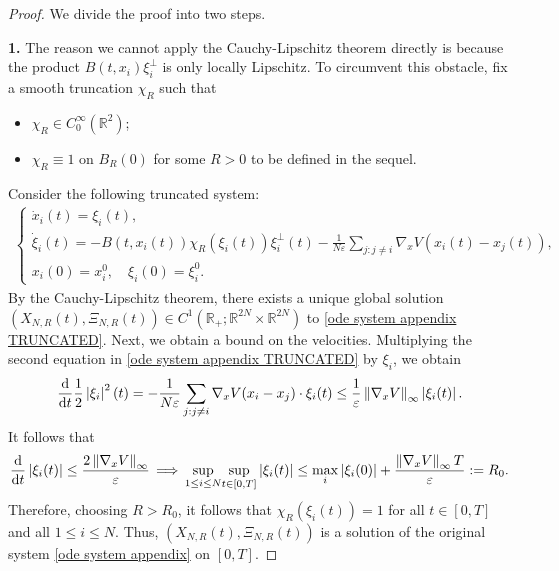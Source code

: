 \documentclass[11pt,reqno]{amsart}
\numberwithin{equation}{section}
\def\dd{{\rm d}}
\begin{document}
\begin{proof} We divide the proof into two steps.

\smallskip
\textbf{1.} The reason we cannot apply the Cauchy-Lipschitz theorem  directly is because the product $B(t,x_{i})\xi_{i}^{\perp}$ is only locally Lipschitz. To circumvent this obstacle, fix a smooth truncation $\chi_{R}$ such that  
\begin{itemize}
 \item[{\rm(a)}] $\chi_{R}\in C^{\infty}_{0}(\mathbb{R}^{2})$; 
\item[{\rm(b)}] $\chi_{R}\equiv 1$ on $B_{R}(0)$ for some $R>0$ to be defined in the sequel. 
\end{itemize}
Consider the following truncated system: 
\begin{align}\tag{N$R$}
\begin{cases}
\dot x_{i}(t)=\xi_{i}(t),\\
\dot \xi_{i}(t)=-B(t,x_{i}(t))\chi_{R}(\xi_{i}(t))\xi_{i}^{\perp}(t)-\frac{1}{N\varepsilon}\underset{j:j\neq i}{\sum}\nabla_{x} V(x_{i}(t)-x_{j}(t)), \\
x_{i}(0)=x_{i}^{0},\quad \xi_{i}(0)=\xi_{i}^{0}. 
\end{cases}
\label{ode system appendix TRUNCATED}
\end{align}
By the Cauchy-Lipschitz theorem, there exists 
a unique global solution $(X_{N,R}(t),\Xi_{N,R}(t))\in C^{1}(\mathbb{R}_{+};\mathbb{R}^{2N}\times \mathbb{R}^{2N})$ to \eqref{ode system appendix TRUNCATED}.  
Next, we obtain a bound on the velocities. 
Multiplying the second equation in \eqref{ode system appendix TRUNCATED} by $\xi_{i}$, we obtain 
\begin{align*}
\frac{\dd}{\dd t}\frac{1}{2}\left\vert \xi_{i}\right\vert^{2}(t)=- \frac{1}{N\varepsilon} \sum_{j:j\neq i}\nabla_{x}V(x_{i}-x_{j})\cdot \xi_{i}(t)\leq \frac{1}{\varepsilon}\left\Vert \nabla_{x}V\right\Vert_{\infty}\left\vert \xi_{i}(t)\right\vert.     
\end{align*}
It follows that 
\begin{align*}
\frac{\dd}{\dd t}\left\vert \xi_{i}(t)\right\vert\leq \frac{2\left\Vert \nabla_{x}V\right\Vert_{\infty}}{\varepsilon}\,\Longrightarrow\, 
\underset{1\leq i\leq N}{\sup}\underset{t\in [0,T]}{\sup}\left\vert \xi_{i}(t)\right\vert
\leq\max_i|\xi_i(0)| +\frac{\left\Vert \nabla_{x}V\right\Vert_{\infty}T} {\varepsilon}:= R_{0}.
\end{align*}
Therefore, choosing $R>R_{0}$, it follows that $\chi_{R}(\xi_{i}(t))=1$ for all $t\in [0,T]$ and all $1\leq i\leq N$. 
Thus, $(X_{N,R}(t),\Xi_{N,R}(t))$ is a solution of the original system \eqref{ode system appendix} on $[0,T]$. 


\end{proof}
\end{document}
